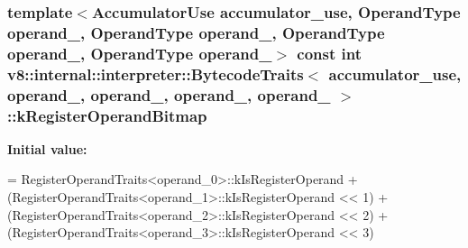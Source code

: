 \subsubsection[{\texorpdfstring{k\+Register\+Operand\+Bitmap}{kRegisterOperandBitmap}}]{\setlength{\rightskip}{0pt plus 5cm}template$<$Accumulator\+Use accumulator\+\_\+use, Operand\+Type operand\+\_, Operand\+Type operand\+\_, Operand\+Type operand\+\_, Operand\+Type operand\+\_$>$ const int {\bf v8\+::internal\+::interpreter\+::\+Bytecode\+Traits}$<$ accumulator\+\_\+use, operand\+\_, operand\+\_, operand\+\_,                                                                                                                                                           operand\+\_ $>$\+::k\+Register\+Operand\+Bitmap\hspace{0.3cm}{\ttfamily [static]}}\hypertarget{structv8_1_1internal_1_1interpreter_1_1_bytecode_traits_3_01accumulator__use_00_01operand__0_00_ad1f88ba519d8dcf4785ba91ce1cb8bd_a8936ea98c7163eca45ee70b0b24f9250}{}\label{structv8_1_1internal_1_1interpreter_1_1_bytecode_traits_3_01accumulator__use_00_01operand__0_00_ad1f88ba519d8dcf4785ba91ce1cb8bd_a8936ea98c7163eca45ee70b0b24f9250}
{\bfseries Initial value\+:}
\begin{DoxyCode}
=
      RegisterOperandTraits<operand\_0>::kIsRegisterOperand +
      (RegisterOperandTraits<operand\_1>::kIsRegisterOperand << 1) +
      (RegisterOperandTraits<operand\_2>::kIsRegisterOperand << 2) +
      (RegisterOperandTraits<operand\_3>::kIsRegisterOperand << 3)
\end{DoxyCode}
